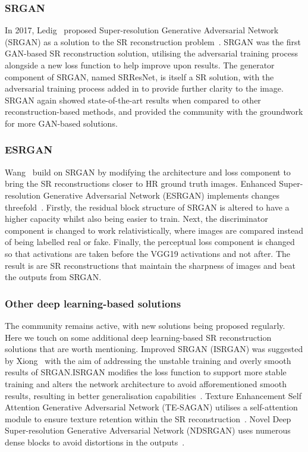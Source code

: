 \subsubsection{SRGAN}
In 2017, Ledig \etal\ proposed Super-resolution Generative Adversarial Network (SRGAN) as a solution to the SR reconstruction problem~\cite{srgan}. SRGAN was the first GAN-based SR reconstruction solution, utilising the adversarial training process alongside a new loss function to help improve upon results. The generator component of SRGAN, named SRResNet, is itself a SR solution, with the adversarial training process added in to provide further clarity to the image. SRGAN again showed state-of-the-art results when compared to other reconstruction-based methods, and provided the community with the groundwork for more GAN-based solutions.

\subsubsection{ESRGAN}
Wang \etal\ build on SRGAN by modifying the architecture and loss component to bring the SR reconstructions closer to HR ground truth images. Enhanced Super-resolution Generative Adversarial Network (ESRGAN) implements changes threefold~\cite{esrgan}. Firstly, the residual block structure of SRGAN is altered to have a higher capacity whilst also being easier to train. Next, the discriminator component is changed to work relativistically, where images are compared instead of being labelled real or fake. Finally, the perceptual loss component is changed so that activations are taken before the VGG19 activations and not after. The result is are SR reconstructions that maintain the sharpness of images and beat the outputs from SRGAN.\@

\subsubsection{Other deep learning-based solutions}
The community remains active, with new solutions being proposed regularly. Here we touch on some additional deep learning-based SR reconstruction solutions that are worth mentioning. Improved SRGAN (ISRGAN) was suggested by Xiong \etal\ with the aim of addressing the unstable training and overly smooth results of SRGAN.\@ ISRGAN modifies the loss function to support more stable training and alters the network architecture to  avoid afforementioned smooth results, resulting in better generalisation capabilities~\cite{isrgan,remoteSensingGANsReview}. Texture Enhancement Self Attention Generative Adversarial Network (TE-SAGAN) utilises a self-attention module to ensure texture retention within the SR reconstruction~\cite{tesagan, remoteSensingGANsReview}. Novel Deep Super-resolution Generative Adversarial Network (NDSRGAN) uses numerous dense blocks to avoid distortions in the outputs~\cite{ndsrgan, remoteSensingGANsReview}. 

